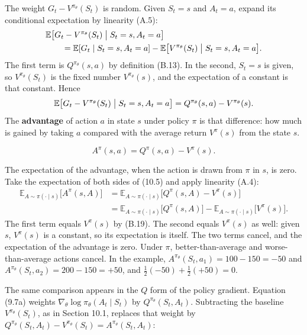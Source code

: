 The weight $G_t-V^{\pi_\theta}(S_t)$ is random. Given $S_t=s$ and $A_t=a$, expand its conditional expectation by linearity (A.5): \[
\begin{aligned}
&\mathbb{E}\bigl[G_t-V^{\pi_\theta}(S_t)\bigm|S_t=s,A_t=a\bigr]
\\
&\qquad=
\mathbb{E}[G_t\mid S_t=s,A_t=a]
-
\mathbb{E}\bigl[V^{\pi_\theta}(S_t)\bigm|S_t=s,A_t=a\bigr].
\end{aligned}
\] The first term is $Q^{\pi_\theta}(s,a)$ by definition (B.13). In the second, $S_t=s$ is given, so $V^{\pi_\theta}(S_t)$ is the fixed number $V^{\pi_\theta}(s)$, and the expectation of a constant is that constant. Hence \[
\mathbb{E}\bigl[G_t-V^{\pi_\theta}(S_t)\bigm|S_t=s,A_t=a\bigr]
=
Q^{\pi_\theta}(s,a)-V^{\pi_\theta}(s).
\] The \textbf{advantage} of action $a$ in state $s$ under policy $\pi$ is that difference: how much is gained by taking $a$ compared with the average return $V^{\pi}(s)$ from the state $s$.

\begin{equation}
A^{\pi}(s,a)
=
Q^{\pi}(s,a)-V^{\pi}(s).
\tag{10.5}
\end{equation}

The expectation of the advantage, when the action is drawn from $\pi$ in $s$, is zero. Take the expectation of both sides of (10.5) and apply linearity (A.4): \[
\begin{aligned}
\mathbb{E}_{A\sim\pi(\cdot\mid s)}\bigl[A^{\pi}(s,A)\bigr]
&=
\mathbb{E}_{A\sim\pi(\cdot\mid s)}\bigl[Q^{\pi}(s,A)-V^{\pi}(s)\bigr]
\\
&=
\mathbb{E}_{A\sim\pi(\cdot\mid s)}\bigl[Q^{\pi}(s,A)\bigr]
-
\mathbb{E}_{A\sim\pi(\cdot\mid s)}\bigl[V^{\pi}(s)\bigr].
\end{aligned}
\] The first term equals $V^{\pi}(s)$ by (B.19). The second equals $V^{\pi}(s)$ as well: given $s$, $V^{\pi}(s)$ is a constant, so its expectation is itself. The two terms cancel, and the expectation of the advantage is zero. Under $\pi$, better-than-average and worse-than-average actions cancel. In the example, $A^{\pi_\theta}(S_t,a_1)=100-150=-50$ and $A^{\pi_\theta}(S_t,a_2)=200-150=+50$, and $\tfrac12(-50)+\tfrac12(+50)=0$.

The same comparison appears in the $Q$ form of the policy gradient. Equation (9.7a) weights $\nabla_\theta\log\pi_\theta(A_t\mid S_t)$ by $Q^{\pi_\theta}(S_t,A_t)$. Subtracting the baseline $V^{\pi_\theta}(S_t)$, as in Section 10.1, replaces that weight by $Q^{\pi_\theta}(S_t,A_t)-V^{\pi_\theta}(S_t)=A^{\pi_\theta}(S_t,A_t)$:

